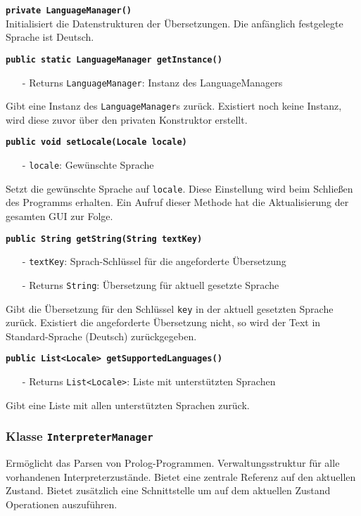 \documentclass[parskip=full,11pt,twoside]{scrartcl}
\begin{document}
\textbf{\texttt{private LanguageManager()}}\\
Initialisiert die Datenstrukturen der Übersetzungen. Die anfänglich festgelegte Sprache ist Deutsch.

\textbf{\texttt{public static LanguageManager getInstance()}}
\begin{itemize}[noitemsep]
	\item[-] Returns \texttt{LanguageManager}: Instanz des LanguageManagers
\end{itemize}
Gibt eine Instanz des \texttt{LanguageManager}s zurück. Existiert noch keine Instanz, wird diese zuvor über den privaten Konstruktor erstellt.

\textbf{\texttt{public void setLocale(Locale locale)}}
\begin{itemize}[noitemsep]
	\item[-] \texttt{locale}: Gewünschte Sprache
\end{itemize}
Setzt die gewünschte Sprache auf \texttt{locale}. Diese Einstellung wird beim Schließen des Programms erhalten. Ein Aufruf dieser Methode hat die Aktualisierung der gesamten GUI zur Folge.

\textbf{\texttt{public String getString(String textKey)}}
\begin{itemize}[noitemsep]
	\item[-] \texttt{textKey}: Sprach-Schlüssel für die angeforderte Übersetzung
	\item[-] Returns \texttt{String}: Übersetzung für aktuell gesetzte Sprache
\end{itemize}
Gibt die Übersetzung für den Schlüssel \texttt{key} in der aktuell gesetzten Sprache zurück. Existiert die angeforderte Übersetzung nicht, so wird der Text in Standard-Sprache (Deutsch) zurückgegeben.

\textbf{\texttt{public List<Locale> getSupportedLanguages()}}
\begin{itemize}[noitemsep]
    \item[-] Returns \texttt{List<Locale>}: Liste mit unterstützten Sprachen
\end{itemize}
Gibt eine Liste mit allen unterstützten Sprachen zurück.

\subsubsection{Klasse \texttt{InterpreterManager}}

Ermöglicht das Parsen von Prolog-Programmen. Verwaltungsstruktur für alle vorhandenen Interpreterzustände. Bietet eine zentrale Referenz auf den aktuellen Zustand. Bietet zusätzlich eine Schnittstelle um auf dem aktuellen Zustand Operationen auszuführen.
\end{document}
